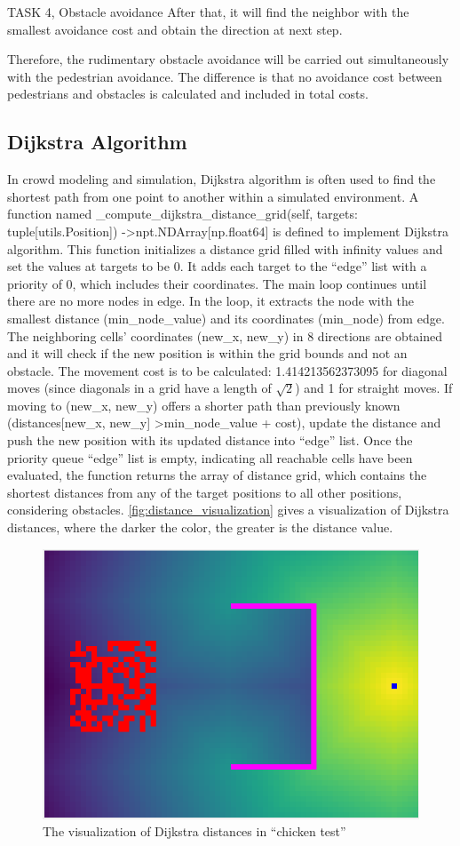 \documentclass[10pt,a4paper]{article}
\begin{document}
\begin{task}{TASK 4, Obstacle avoidance}
After that, it will find the neighbor with the smallest avoidance cost and obtain the direction at next step.

Therefore, the rudimentary obstacle avoidance will be carried out simultaneously with the pedestrian avoidance. The difference is that no avoidance cost between pedestrians and obstacles is calculated and included in total costs.

\subsection{Dijkstra Algorithm}

In crowd modeling and simulation, Dijkstra algorithm is often used to find the shortest path from one point to another within a simulated environment. A function named \_compute\_dijkstra\_distance\_grid(self, targets: tuple[utils.Position]) -\textgreater npt.NDArray[np.float64] is defined to implement Dijkstra algorithm. This function initializes a distance grid filled with infinity values and set the values at targets to be 0. It adds each target to the ``edge'' list with a priority of 0, which includes their coordinates. The main loop continues until there are no more nodes in edge. In the loop, it extracts the node with the smallest distance (min\_node\_value) and its coordinates (min\_node) from edge. The neighboring cells' coordinates (new\_x, new\_y) in 8 directions are obtained and it will check if the new position is within the grid bounds and not an obstacle. The movement cost is to be calculated: 1.414213562373095 for diagonal moves (since diagonals in a grid have a length of $\sqrt{2}$) and 1 for straight moves. If moving to (new\_x, new\_y) offers a shorter path than previously known (distances[new\_x, new\_y] \textgreater min\_node\_value + cost), update the distance and push the new position with its updated distance into ``edge'' list. Once the priority queue ``edge'' list is empty, indicating all reachable cells have been evaluated, the function returns the array of distance grid, which contains the shortest distances from any of the target positions to all other positions, considering obstacles. \autoref{fig:distance_visualization} gives a visualization of Dijkstra distances, where the darker the color, the greater is the distance value.

\begin{figure}
    \centering
    \includegraphics[width=0.5\linewidth]{distance_visualization.png}
    \caption{The visualization of Dijkstra distances in ``chicken test''}
    \label{fig:distance_visualization}
\end{figure}


\end{task}
\end{document}
